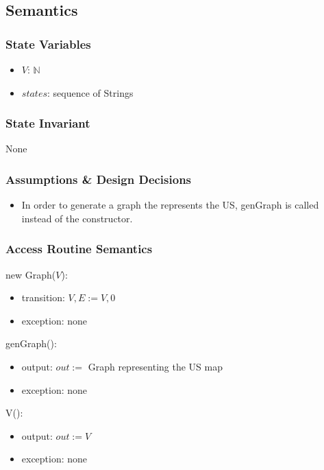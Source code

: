 \documentclass[12pt]{article}
\begin{document}
\subsection* {Semantics}

\subsubsection* {State Variables}

\begin{itemize}
\item $V$: $\mathbb{N}$
\item $states$: sequence of Strings
\end{itemize}

\subsubsection* {State Invariant}

None

\subsubsection* {Assumptions \& Design Decisions}

\begin{itemize}
\item In order to generate a graph the represents the US, genGraph is called instead of the constructor.
\end{itemize}

\subsubsection* {Access Routine Semantics}

new Graph($V$):
\begin{itemize}
\item transition: $V, E := V, 0$
\item exception: none
\end{itemize}

\noindent genGraph():
\begin{itemize}
\item output: $out :=$ Graph representing the US map
\item exception: none
\end{itemize}

\noindent V():
\begin{itemize}
\item output: $out := V$
\item exception: none
\end{itemize}
\end{document}
